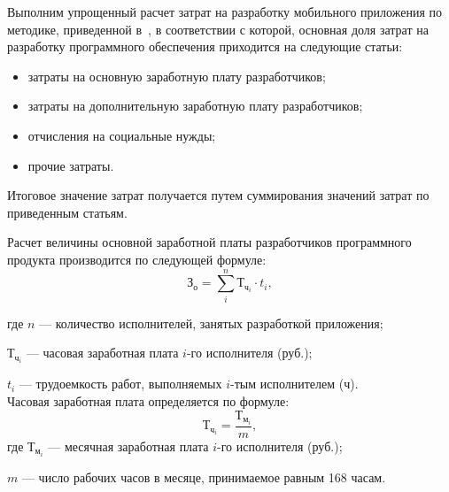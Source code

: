 Выполним упрощенный расчет затрат на разработку мобильного приложения
по методике, приведенной в~\cite{diploma_teo}, в соответствии с которой,
основная доля затрат на разработку программного обеспечения приходится
на следующие статьи:
\begin{itemize}
  \item затраты на основную заработную плату разработчиков;
  \item затраты на дополнительную заработную плату разработчиков;
  \item отчисления на социальные нужды;
  \item прочие затраты.
\end{itemize}

Итоговое значение затрат получается путем суммирования значений затрат
по приведенным статьям.

Расчет величины основной заработной платы разработчиков программного
продукта производится по следующей формуле:
\begin{equation}
  \text{З}_{\text{о}} =
  \sum^n_i \text{Т}_{\text{ч}_{i}} \cdot t_{i},
\end{equation}

\noindent где
\( n \)
--- количество исполнителей, занятых разработкой приложения; \par
\noindent \hspace{6.5mm} \( \text{Т}_{\text{ч}_{i}} \)
--- часовая заработная плата \( i \)-го исполнителя (руб.); \par
\noindent \hspace{6.5mm} \( t_i \)
--- трудоемкость работ, выполняемых \( i \)-тым исполнителем (ч). \\

Часовая заработная плата определяется по формуле:
\begin{equation}
  \text{Т}_{\text{ч}_{i}} = \dfrac{\text{Т}_{\text{м}_{i}}}{m},
\end{equation}
\noindent где
\( \text{Т}_{\text{м}_{i}} \) --- месячная заработная плата \( i \)-го
исполнителя (руб.); \par
\noindent \hspace{6.2mm} \( m \) --- число рабочих часов в месяце,
принимаемое равным 168 часам. \\

